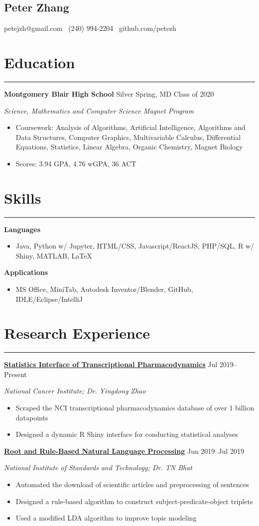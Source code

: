 \documentclass[11pt]{article}
\newcommand{\name}[1]{\begin{center}\section*{\huge \color{highlight} #1}\end{center}}
\newcommand{\topinfo}[1]{\begin{center}\vspace{-0.2cm}#1\vspace{-0.2cm}\end{center}}
\newcommand{\resumesection}[1]{\vspace{-0.3cm}\section*{\color{highlight}#1}\vspace{-0.3cm}\hrule\vspace{0.3cm}}
\begin{document}
\name{Peter Zhang}
\topinfo{petejzh@gmail.com \textbullet\ (240) 994-2204 \textbullet\ github.com/petezh}

\resumesection{Education}

\textbf{Montgomery Blair High School} Silver Spring, MD \hfill Class of 2020 \par
\textit{Science, Mathematics and Computer Science Magnet Program}

\begin{itemize}
	\item Coursework: Analysis of Algorithms, Artificial Intelligence, Algorithms and Data Structures, Computer Graphics, Multivariable Calculus, Differential Equations, Statistics, Linear Algebra, Organic Chemistry, Magnet Biology
	\item Scores: 3.94 GPA, 4.76 wGPA,  36 ACT
\end{itemize}


\resumesection{Skills}

\textbf{Languages}
\begin{itemize} 
	\item Java, Python w/ Jupyter, HTML/CSS, Javascript/ReactJS, PHP/SQL, R w/ Shiny, MATLAB, \LaTeX
\end{itemize}\vspace{0.1cm}

\textbf{Applications}
\begin{itemize} 
	\item MS Office, MiniTab, Autodesk Inventor/Blender, GitHub, IDLE/Eclipse/IntelliJ
\end{itemize}

\resumesection{Research Experience}

\textbf{\href{https://github.com/petezh/TP-Workbench}{Statistics Interface of Transcriptional Pharmacodynamics}} \hfill Jul 2019--Present \par
\textit{National Cancer Institute; Dr. Yingdong Zhao}
\begin{itemize}
	\item Scraped the NCI transcriptional pharmacodynamics database of over 1 billion datapoints
	\item Designed a dynamic R Shiny interface for conducting statistical analyses
\end{itemize}\vspace{0.1cm}

\textbf{\href{https://github.com/petezh/Root-and-Rule-NLP}{Root and Rule-Based Natural Language Processing}} \hfill Jun 2019--Jul 2019\par
\textit{National Institute of Standards and Technology; Dr. TN Bhat}
\begin{itemize}
	\item Automated the download of scientific articles and preprocessing of sentences
	\item Designed a rule-based algorithm to construct subject-predicate-object triplets
	\item Used a modified LDA algorithm to improve topic modeling
\end{itemize}\vspace{0.1cm}
\end{document}

